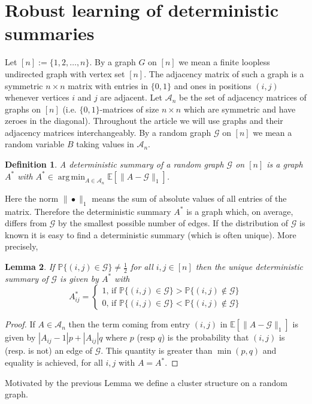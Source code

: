 \documentclass[12pt]{amsart}
\newtheorem{lemma}{Lemma}[section]
\newtheorem{definition}[lemma]{Definition}
\theoremstyle{remark}
\DeclareMathOperator*{\argmin}{arg\,min}
\newcommand{\PP}{\mathbb{P}}
\newcommand{\EE}{\mathbb{E}}
\newcommand{\grG}{{\mathcal{G}}}
\begin{document}
\section{Robust learning of deterministic summaries}
Let $[n]:=\{1,2,\dots, n\}$. By a graph $G$ on $[n]$ we mean a finite loopless undirected graph with vertex set $[n]$. The adjacency matrix of such a graph is a symmetric $n\times n$ matrix with entries in $\{0,1\}$ and ones in positions $(i,j)$ whenever vertices $i$ and $j$ are adjacent. Let $\mathcal{A}_n$ be the set of adjacency matrices of graphs on $[n]$ (i.e. $\{0,1\}$-matrices of size $n\times n$ which are symmetric and have zeroes in the diagonal). Throughout the article we will use graphs and their adjacency matrices interchangeably. By a random graph $\grG$ on $[n]$ we mean a random variable $B$ taking values in $\mathcal{A}_n$.

\begin{definition} A {\it deterministic summary} of a random graph $\grG$ on $[n]$ is a graph $A^*$ with $A^*\in \argmin_{A\in\mathcal{A}_n} \EE[\|A-\grG\|_1]$.
\end{definition}
Here the norm $\|\bullet\|_1$ means the sum of absolute values of all entries of the matrix. Therefore the deterministic summary $A^*$ is a graph which, on average, differs from $\grG$ by the smallest possible number of edges. If the distribution of $\grG$ is known it is easy to find a deterministic summary (which is often unique). More precisely,

\begin{lemma}\label{lem: withDist} If $\PP\{(i,j)\in \grG\}\neq \frac{1}{2}$ for all $i,j\in [n]$ then the unique deterministic summary of $\grG$ is given by $A^*$ with
\[A^*_{ij}=
\begin{cases}
1\text{, if $\PP\{(i,j)\in \grG\}> \PP\{(i,j)\not\in \grG\}$}\\
0\text{, if $\PP\{(i,j)\in \grG\}< \PP\{(i,j)\not\in \grG\}$}
\end{cases}\]
\end{lemma}
\begin{proof} If $A\in \mathcal{A}_n$ then the term coming from entry $(i,j)$ in $\EE[\|A-\grG\|_1]$ is given by $|A_{ij}-1|p+|A_{ij}|q$ where $p$ (resp $q$) is the probability that $(i,j)$ is (resp. is not) an edge of $\grG$. This quantity is greater than $\min(p,q)$ and equality is achieved, for all $i,j$ with $A=A^*$. 
\end{proof}

Motivated by the previous Lemma we define a cluster structure on a random graph.
\end{document}
